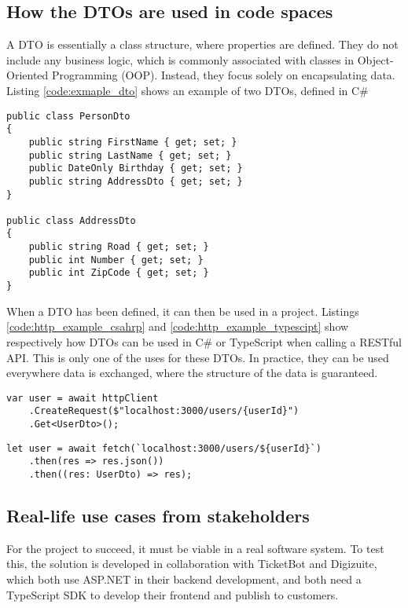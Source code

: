 \subsection{How the DTOs are used in code spaces}
A DTO is essentially a class structure, where properties are defined.
They do not include any business logic, which is commonly associated with classes in Object-Oriented Programming (OOP). Instead, they focus solely on encapsulating data.
Listing \ref{code:exmaple_dto} shows an example of two DTOs, defined in C\#
\begin{lstlisting}[caption={Example of a C\# DTO}, label={code:exmaple_dto}, style=base_csharp]
public class PersonDto
{
    public string FirstName { get; set; } 
    public string LastName { get; set; } 
    public DateOnly Birthday { get; set; } 
    public string AddressDto { get; set; } 
}

public class AddressDto
{
    public string Road { get; set; } 
    public int Number { get; set; } 
    public int ZipCode { get; set; } 
}
\end{lstlisting}
\noindent
When a DTO has been defined, it can then be used in a project.
Listings \ref{code:http_example_csahrp} and \ref{code:http_example_typescipt} show respectively how DTOs can be used in C\# or TypeScript when calling a RESTful API.
This is only one of the uses for these DTOs. 
In practice, they can be used everywhere data is exchanged, where the structure of the data is guaranteed.
\begin{lstlisting}[caption={DTO used in a GET request in C\#}, label={code:http_example_csahrp}, style=base_csharp]
var user = await httpClient
    .CreateRequest($"localhost:3000/users/{userId}")
    .Get<UserDto>();
\end{lstlisting}
\begin{lstlisting}[caption={DTO used in a GET request in TypeScript}, label={code:http_example_typescipt}, style=base_typescript]
let user = await fetch(`localhost:3000/users/${userId}`)
    .then(res => res.json())
    .then((res: UserDto) => res);
\end{lstlisting}

\subsection{Real-life use cases from stakeholders \label{sec:intro_use_cases}}
For the project to succeed, it must be viable in a real software system.
To test this, the solution is developed in collaboration with TicketBot and Digizuite, which both use ASP.NET in their backend development, and both need a TypeScript SDK to develop their frontend and publish to customers.

